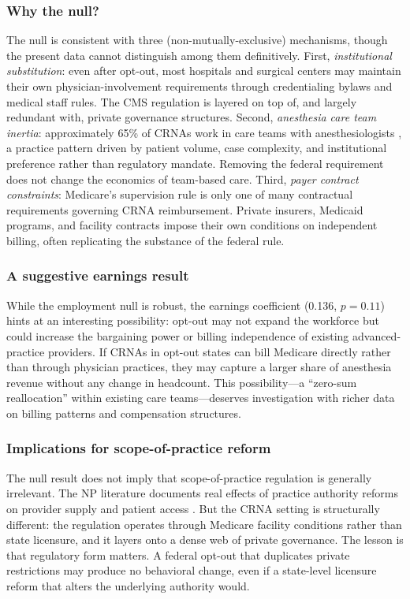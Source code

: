 \documentclass[12pt]{article}
\begin{document}
\subsubsection*{Why the null?} The null is consistent with three (non-mutually-exclusive) mechanisms, though the present data cannot distinguish among them definitively. First, \emph{institutional substitution}: even after opt-out, most hospitals and surgical centers may maintain their own physician-involvement requirements through credentialing bylaws and medical staff rules. The CMS regulation is layered on top of, and largely redundant with, private governance structures. Second, \emph{anesthesia care team inertia}: approximately 65\% of CRNAs work in care teams with anesthesiologists \citep{negrusa2016scope}, a practice pattern driven by patient volume, case complexity, and institutional preference rather than regulatory mandate. Removing the federal requirement does not change the economics of team-based care. Third, \emph{payer contract constraints}: Medicare's supervision rule is only one of many contractual requirements governing CRNA reimbursement. Private insurers, Medicaid programs, and facility contracts impose their own conditions on independent billing, often replicating the substance of the federal rule.

\subsubsection*{A suggestive earnings result} While the employment null is robust, the earnings coefficient (0.136, $p = 0.11$) hints at an interesting possibility: opt-out may not expand the workforce but could increase the bargaining power or billing independence of existing advanced-practice providers. If CRNAs in opt-out states can bill Medicare directly rather than through physician practices, they may capture a larger share of anesthesia revenue without any change in headcount. This possibility---a ``zero-sum reallocation'' within existing care teams---deserves investigation with richer data on billing patterns and compensation structures.

\subsubsection*{Implications for scope-of-practice reform} The null result does not imply that scope-of-practice regulation is generally irrelevant. The NP literature documents real effects of practice authority reforms on provider supply and patient access \citep{alexander2019nursing, traczynski2019regulation}. But the CRNA setting is structurally different: the regulation operates through Medicare facility conditions rather than state licensure, and it layers onto a dense web of private governance. The lesson is that regulatory form matters. A federal opt-out that duplicates private restrictions may produce no behavioral change, even if a state-level licensure reform that alters the underlying authority would.
\end{document}
